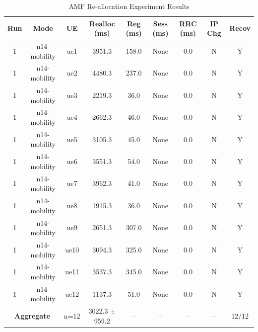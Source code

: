 \begin{table}[ht]
\centering
\begin{tabular}{|c|c|c|c|c|c|c|c|c|}
\hline
Run & Mode & UE & Realloc (ms) & Reg (ms) & Sess (ms) & RRC (ms) & IP Chg & Recov \\
\hline
1 & n14-mobility & ue1 & 3951.3 & 158.0 & None & 0.0 & N & Y \\
1 & n14-mobility & ue2 & 4480.3 & 237.0 & None & 0.0 & N & Y \\
1 & n14-mobility & ue3 & 2219.3 & 36.0 & None & 0.0 & N & Y \\
1 & n14-mobility & ue4 & 2662.3 & 46.0 & None & 0.0 & N & Y \\
1 & n14-mobility & ue5 & 3105.3 & 45.0 & None & 0.0 & N & Y \\
1 & n14-mobility & ue6 & 3551.3 & 54.0 & None & 0.0 & N & Y \\
1 & n14-mobility & ue7 & 3962.3 & 41.0 & None & 0.0 & N & Y \\
1 & n14-mobility & ue8 & 1915.3 & 36.0 & None & 0.0 & N & Y \\
1 & n14-mobility & ue9 & 2651.3 & 307.0 & None & 0.0 & N & Y \\
1 & n14-mobility & ue10 & 3094.3 & 325.0 & None & 0.0 & N & Y \\
1 & n14-mobility & ue11 & 3537.3 & 345.0 & None & 0.0 & N & Y \\
1 & n14-mobility & ue12 & 1137.3 & 51.0 & None & 0.0 & N & Y \\
\multicolumn{2}{|c|}{\textbf{Aggregate}} & n=12 & 3022.3 $\pm$ 959.2 & -- & -- & -- & -- & 12/12 \\
\hline
\end{tabular}
\caption{AMF Re-allocation Experiment Results}
\label{tab:amf_realloc}
\end{table}
